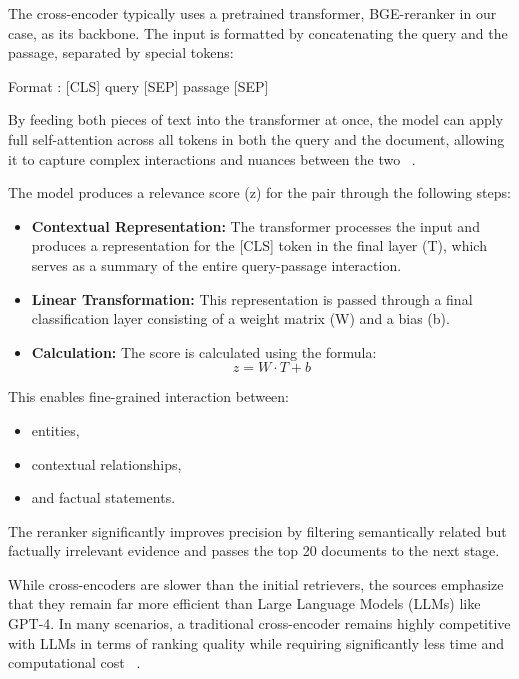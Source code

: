 The cross-encoder typically uses a pretrained transformer, BGE-reranker in our case, as its backbone. The input is formatted by concatenating the query and the passage, separated by special tokens:

Format : [CLS] query [SEP] passage [SEP]

By feeding both pieces of text into the transformer at once, the model can apply full self-attention across all tokens in both the query and the document, allowing it to capture complex interactions and nuances between the two ~\cite{BibEntry2026May}.

The model produces a relevance score (z) for the pair through the following steps:
\begin{itemize}
    \item \textbf{Contextual Representation:} The transformer processes the input and produces a representation for the [CLS] token in the final layer (T), which serves as a summary of the entire query-passage interaction.
    \item \textbf{Linear Transformation:} This representation is passed through a final classification layer consisting of a weight matrix (W) and a bias (b).
    \item \textbf{Calculation:} The score is calculated using the formula:
        \begin{equation}
            z = W \cdot T + b
        \end{equation}
\end{itemize}

This enables fine-grained interaction between:
\begin{itemize}
    \item entities,
    \item contextual relationships,
    \item and factual statements.
\end{itemize}

The reranker significantly improves precision by filtering semantically related but factually irrelevant evidence and passes the top 20 documents to the next stage.

While cross-encoders are slower than the initial retrievers, the sources emphasize that they remain far more efficient than Large Language Models (LLMs) like GPT-4. In many scenarios, a traditional cross-encoder remains highly competitive with LLMs in terms of ranking quality while requiring significantly less time and computational cost ~\cite{Dejean2024Mar}.

